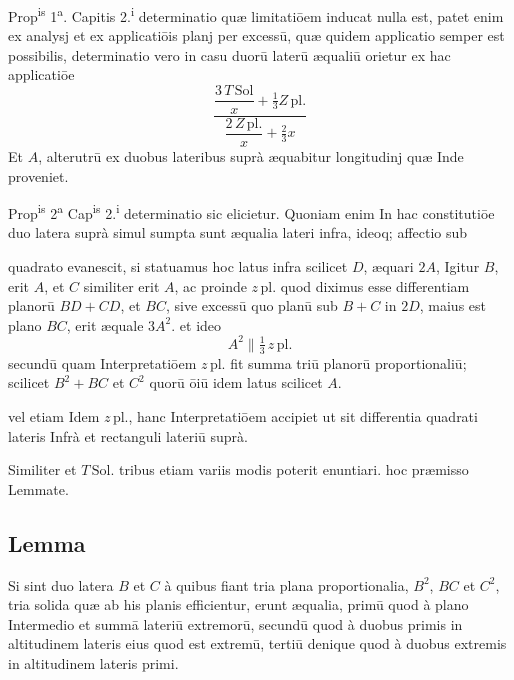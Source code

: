 \documentclass[11pt,a4paper]{article}
\begin{document}
Prop\textsuperscript{is} 1\textsuperscript{a}. Capitis 2.\textsuperscript{i} determinatio quæ limitatiōem inducat nulla est, patet enim ex analysj et ex applicatiōis planj per excessū, quæ quidem applicatio semper est possibilis, determinatio vero in casu duorū laterū æqualiū orietur ex hac applicatiōe
\[ \frac{\dfrac{3\,T\,\mathrm{Sol}}{x} + \tfrac{1}{3}Z\,\mathrm{pl.}}{\dfrac{2\,Z\,\mathrm{pl.}}{x} + \tfrac{2}{3}x} \]
Et $A$, alterutrū ex duobus lateribus suprà æquabitur longitudinj quæ Inde proveniet.

Prop\textsuperscript{is} 2\textsuperscript{a} Cap\textsuperscript{is} 2.\textsuperscript{i} determinatio sic elicietur. Quoniam enim In hac constitutiōe duo latera suprà simul sumpta sunt æqualia lateri infra, ideoq; affectio sub


quadrato evanescit, si statuamus hoc latus infra scilicet $D$, æquari $2A$, Igitur $B$, erit $A$, et $C$ similiter erit $A$, ac proinde $z\,\mathrm{pl.}$ quod diximus esse differentiam planorū $BD + CD$, et $BC$, sive excessū quo planū sub $B + C$ in $2D$, maius est plano $BC$, erit æquale $3A^{2}$. et ideo
\[ A^{2} \parallel \tfrac{1}{3}\,z\,\mathrm{pl.} \]
secundū quam Interpretatiōem $z\,\mathrm{pl.}$ fit summa triū planorū proportionaliū; scilicet $B^{2} + BC$ et $C^{2}$ quorū ōiū idem latus scilicet $A$.

vel etiam Idem $z\,\mathrm{pl.}$, hanc Interpretatiōem accipiet ut sit differentia quadrati lateris Infrà et rectanguli lateriū suprà.

Similiter et $T\,\mathrm{Sol.}$ tribus etiam variis modis poterit enuntiari. hoc præmisso Lemmate.

\subsection*{Lemma}

Si sint duo latera $B$ et $C$ à quibus fiant tria plana proportionalia, $B^{2}$, $BC$ et $C^{2}$, tria solida quæ ab his planis efficientur, erunt æqualia, primū quod à plano Intermedio et summā lateriū extremorū, secundū quod à duobus primis in altitudinem lateris eius quod est extremū, tertiū denique quod à duobus extremis in altitudinem lateris primi.
\end{document}
